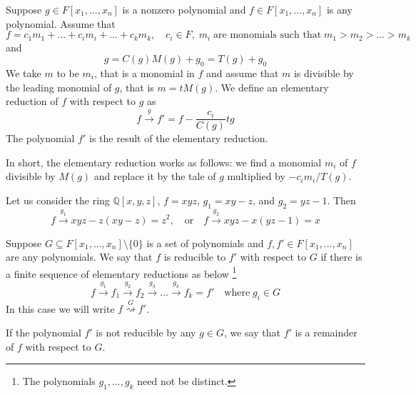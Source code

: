 \begin{definition}
Suppose $g\in F[x_1,\ldots,x_n]$ is a nonzero polynomial and $f\in F[x_1,\ldots,x_n]$ is any polynomial.
Assume that
\[
f= c_1m_1 + \ldots + c_i m_i + \ldots + c_k m_k,\quad c_i\in F,\;m_i\;\text{are monomials such that}\; m_1 > m_2 >\ldots>m_k
\]
and
\[
g = C(g) M(g) + g_0 = T(g) + g_0
\]
We take $m$ to be $m_i$, that is a monomial in $f$ and assume that $m$ is divisible by the leading monomial of $g$, that is $m = t M(g)$.
We define an elementary reduction of $f$ with respect to $g$ as 
\[
f\stackrel{g}{\longrightarrow} f' = f - \frac{c_i}{C(g)}t g
\]
The polynomial $f'$ is the result of the elementary reduction.
\end{definition}

In short, the elementary reduction works as follows: we find a monomial  $m_i$ of $f$ divisible by $M(g)$ and replace it by the tale of $g$ multiplied by $- c_i m_i / T(g)$.

\begin{example}
Let us consider the ring $\mathbb Q[x, y, z]$, $f = xyz$, $g_1 = xy - z$, and $g_2 = yz - 1$.
Then
\[
f\stackrel{g_1}{\longrightarrow} xyz - z(xy - z) = z^2,
\quad\text{or}\quad
f\stackrel{g_2}{\longrightarrow} xyz - x(yz - 1) = x
\]
\end{example}

\begin{definition}
Suppose $G\subseteq F[x_1,\ldots,x_n]\setminus \{0\}$ is a set of polynomials and $f, f'\in F[x_1,\ldots,x_n]$ are any polynomials.
We say that $f$ is reducible to $f'$ with respect to $G$ if there is a finite sequence of elementary reductions as below%
\footnote{The polynomials $g_1,\ldots,g_k$ need not be distinct.}
\[
f\stackrel{g_1}{\longrightarrow}f_1\stackrel{g_2}{\longrightarrow}f_2\stackrel{g_3}{\longrightarrow}\ldots \stackrel{g_k}{\longrightarrow}f_k = f'\quad\text{where}\;g_i \in G
\]
In this case we will write $f\stackrel{G}{\rightsquigarrow} f'$.

If the polynomial $f'$ is not reducible by any $g\in G$, we say that $f'$ is a remainder of $f$ with respect to $G$.
\end{definition}


